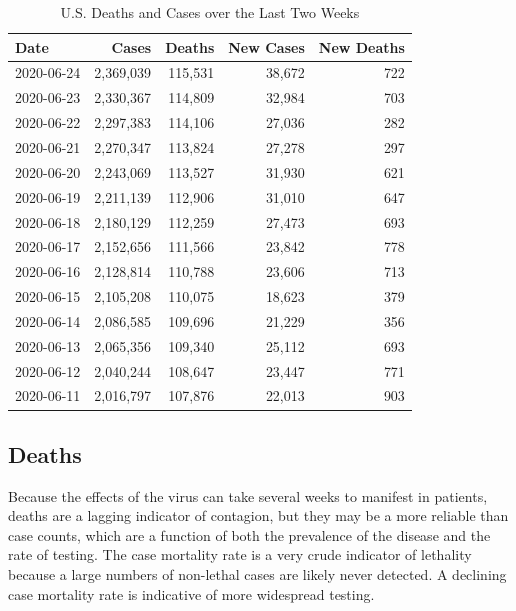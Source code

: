 \documentclass[]{article}
\begin{document}
\begin{table}[!h]

\caption{\label{tab:unnamed-chunk-8}U.S. Deaths and Cases over the Last Two Weeks}
\centering
\begin{tabular}{l|r|r|r|r}
\hline
Date & Cases & Deaths & New Cases & New Deaths\\
\hline
2020-06-24 & 2,369,039 & 115,531 & 38,672 & 722\\
\hline
2020-06-23 & 2,330,367 & 114,809 & 32,984 & 703\\
\hline
2020-06-22 & 2,297,383 & 114,106 & 27,036 & 282\\
\hline
2020-06-21 & 2,270,347 & 113,824 & 27,278 & 297\\
\hline
2020-06-20 & 2,243,069 & 113,527 & 31,930 & 621\\
\hline
2020-06-19 & 2,211,139 & 112,906 & 31,010 & 647\\
\hline
2020-06-18 & 2,180,129 & 112,259 & 27,473 & 693\\
\hline
2020-06-17 & 2,152,656 & 111,566 & 23,842 & 778\\
\hline
2020-06-16 & 2,128,814 & 110,788 & 23,606 & 713\\
\hline
2020-06-15 & 2,105,208 & 110,075 & 18,623 & 379\\
\hline
2020-06-14 & 2,086,585 & 109,696 & 21,229 & 356\\
\hline
2020-06-13 & 2,065,356 & 109,340 & 25,112 & 693\\
\hline
2020-06-12 & 2,040,244 & 108,647 & 23,447 & 771\\
\hline
2020-06-11 & 2,016,797 & 107,876 & 22,013 & 903\\
\hline
\end{tabular}
\end{table}

\newpage

\hypertarget{deaths}{%
\subsection{Deaths}\label{deaths}}

Because the effects of the virus can take several weeks to manifest in
patients, deaths are a lagging indicator of contagion, but they may be a
more reliable than case counts, which are a function of both the
prevalence of the disease and the rate of testing. The case mortality
rate is a very crude indicator of lethality because a large numbers of
non-lethal cases are likely never detected. A declining case mortality
rate is indicative of more widespread testing.
\end{document}
